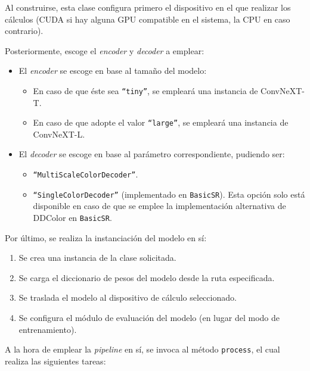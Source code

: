 \documentclass[a4paper]{article}
\begin{document}
Al construirse, esta clase configura primero el dispositivo en el que realizar los cálculos (CUDA si hay alguna GPU compatible en el sistema, la CPU en caso contrario).

Posteriormente, escoge el \textit{encoder} y \textit{decoder} a emplear:

\begin{itemize}
  \item{El \textit{encoder} se escoge en base al tamaño del modelo:
    \begin{itemize}
      \item{En caso de que éste sea \texttt{``tiny''}, se empleará una instancia de ConvNeXT-T.}
      \item{En caso de que adopte el valor \texttt{``large''}, se empleará una instancia de ConvNeXT-L.}
    \end{itemize}
  }
  \item{El \textit{decoder} se escoge en base al parámetro correspondiente, pudiendo ser:
    \begin{itemize}
      \item{\texttt{``MultiScaleColorDecoder''}.}
      \item{\texttt{``SingleColorDecoder''} (implementado en \texttt{BasicSR}). Esta opción solo está disponible en caso de que se emplee la implementación alternativa de DDColor en \texttt{BasicSR}.}
    \end{itemize}
  }
\end{itemize}

Por último, se realiza la instanciación del modelo en sí:

\begin{enumerate}
  \item{Se crea una instancia de la clase solicitada.}
  \item{Se carga el diccionario de pesos del modelo desde la ruta especificada.}
  \item{Se traslada el modelo al dispositivo de cálculo seleccionado.}
  \item{Se configura el módulo de evaluación del modelo (en lugar del modo de entrenamiento).}
\end{enumerate}

A la hora de emplear la \textit{pipeline} en sí, se invoca al método \texttt{process}, el cual realiza las siguientes tareas:
\end{document}
